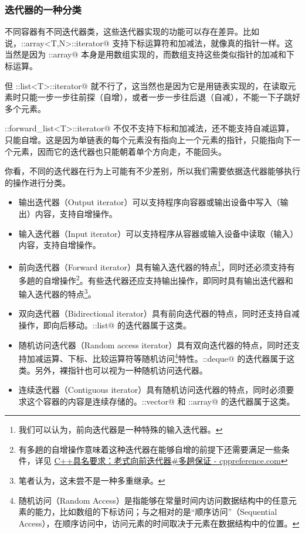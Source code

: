 \subsubsection*{迭代器的一种分类}
不同容器有不同迭代器类，这些迭代器实现的功能可以存在差异。比如说，\lstinline@std::array<T,N>::iterator@ 支持下标运算符和加减法，就像真的指针一样。这当然是因为 \lstinline@std::array@ 本身是用数组实现的，而数组支持这些类似指针的加减和下标运算。\par
但 \lstinline@std::list<T>::iterator@ 就不行了，这当然也是因为它是用链表实现的，在读取元素时只能一步一步往前探（自增），或者一步一步往后退（自减），不能一下子跳好多个元素。\par
\lstinline@std::forward_list<T>::iterator@ 不仅不支持下标和加减法，还不能支持自减运算，只能自增。这是因为单链表的每个元素没有指向上一个元素的指针，只能指向下一个元素，因而它的迭代器也只能朝着单个方向走，不能回头。\par
你看，不同的迭代器在行为上可能有不少差别，所以我们需要依据迭代器能够执行的操作进行分类。
\begin{itemize}
    \item 输出迭代器（Output iterator）可以支持程序向容器或输出设备中写入（输出）内容，支持自增操作。
    \item 输入迭代器（Input iterator）可以支持程序从容器或输入设备中读取（输入）内容，支持自增操作。
    \item 前向迭代器（Forward iterator）具有输入迭代器的特点\footnote{我们可以认为，前向迭代器是一种特殊的输入迭代器。}，同时还必须支持有多趟的自增操作\footnote{有多趟的自增操作意味着这种迭代器在能够自增的前提下还需要满足一些条件，详见 \href{https://zh.cppreference.com/w/cpp/named_req/ForwardIterator\#.E5.A4.9A.E8.B6.9F.E4.BF.9D.E8.AF.81}{C++具名要求：老式向前迭代器\#多趟保证 - cppreference.com}}。有些迭代器还应支持输出操作，即同时具有输出迭代器和输入迭代器的特点\footnote{笔者认为，这未尝不是一种多重继承。}。
    \item 双向迭代器（Bidirectional iterator）具有前向迭代器的特点，同时还支持自减操作，即向后移动。\lstinline@std::list@ 的迭代器属于这类。
    \item 随机访问迭代器（Random access iterator）具有双向迭代器的特点，同时还支持加减运算、下标、比较运算符等随机访问\footnote{
        随机访问（Random Access）是指能够在常量时间内访问数据结构中的任意元素的能力，比如数组的下标访问；与之相对的是“顺序访问”（Sequential Access），在顺序访问中，访问元素的时间取决于元素在数据结构中的位置。}特性。\lstinline@std::deque@ 的迭代器属于这类。另外，裸指针也可以视为一种随机访问迭代器。
    \item 连续迭代器（Contiguous iterator）具有随机访问迭代器的特点，同时必须要求这个容器的内容是连续存储的。\lstinline@std::vector@ 和 \lstinline@std::array@ 的迭代器属于这类。
\end{itemize}
